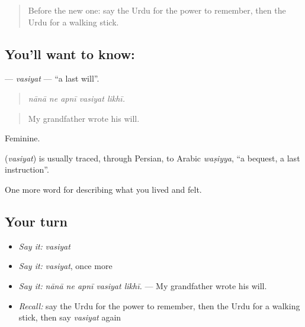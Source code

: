 \label{lesson:UR-C492-vasiyat}



\begin{quote}
Before the new one: say the Urdu for the power to remember, then the Urdu for a walking stick.
\end{quote}

\subsection*{You'll want to know: }
\textbf{} — \emph{vasiyat} — \textquotedblleft{}a last will\textquotedblright{}.

\begin{quote}
    
\end{quote}

\begin{quote}
\emph{nānā ne apnī vasiyat likhī.}
\end{quote}

\begin{quote}
My grandfather wrote his will.
\end{quote}

Feminine.

\begin{cousinweb}
\textbf{} (\emph{vasiyat}) is usually traced, through Persian, to Arabic \emph{waṣiyya}, \textquotedblleft{}a bequest, a last instruction\textquotedblright{}.
\end{cousinweb}

\begin{grammarlens}[title={What you've built}]
One more word for describing what you lived and felt.
\end{grammarlens}

\subsection*{Your turn}
\begin{itemize}
\raggedright
  \item \emph{Say it:} \emph{vasiyat}
  \item \emph{Say it:} \emph{vasiyat}, once more
  \item \emph{Say it:} \emph{nānā ne apnī vasiyat likhī.} — My grandfather wrote his will.
  \item \emph{Recall:} say the Urdu for the power to remember, then the Urdu for a walking stick, then say \emph{vasiyat} again
\end{itemize}

